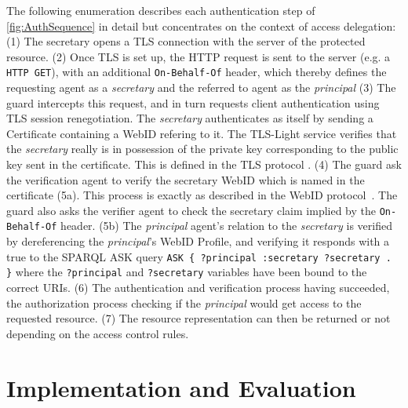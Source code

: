 \documentclass[a4paper]{llncs}
\begin{document}
The following enumeration describes each authentication step of \autoref{fig:AuthSequence} in detail but concentrates on the context of access delegation:
(1) The secretary  opens a TLS connection with the server of the protected resource.
(2) Once TLS is set up, the HTTP request is sent to the server (e.g. a \verb!HTTP GET!), with an additional \lstinline|On-Behalf-Of| header, which thereby defines the requesting agent as a \textit{secretary} and the referred to agent as the \textit{principal} 
(3) The guard intercepts this request, and  in turn requests client authentication using TLS session renegotiation.
The \textit{secretary} authenticates as itself by sending a Certificate containing a WebID refering to it. The TLS-Light service verifies that the \textit{secretary} really is in possession of the private key corresponding to the public key sent in the certificate.
This is defined in the TLS protocol \cite{dierks-t-2012--a}.
(4) The guard ask the verification agent to verify the secretary WebID which is named in the certificate (5a).
This process is exactly as described in the WebID protocol~\cite{story-h-2009--a}.
The guard also asks the verifier agent to check the secretary claim implied by the \lstinline|On-Behalf-Of| header.
(5b) The \textit{principal} agent's relation to the \textit{secretary} is  verified by dereferencing the \textit{principal}'s WebID Profile, and verifying it responds with a true to the SPARQL ASK query \lstinline|ASK { ?principal :secretary ?secretary . }| where the \lstinline|?principal| and \lstinline|?secretary| variables have been bound to the correct URIs.
(6) The authentication and verification process having succeeded, the authorization process checking if the \textit{principal} would get access to the requested resource.
(7) The resource representation can then be returned or not depending on the access control rules.


\section{Implementation and Evaluation}\label{sec:eval}
\end{document}

